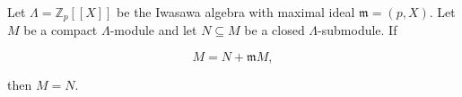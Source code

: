 Let $\Lambda = \mathbb{Z}_p[[X]]$ be the Iwasawa algebra with maximal ideal $\mathfrak{m} = (p, X)$. Let $M$ be a compact $\Lambda$-module and let $N \subseteq M$ be a closed $\Lambda$-submodule. If

$$M = N + \mathfrak{m}M,$$

then $M = N$.
